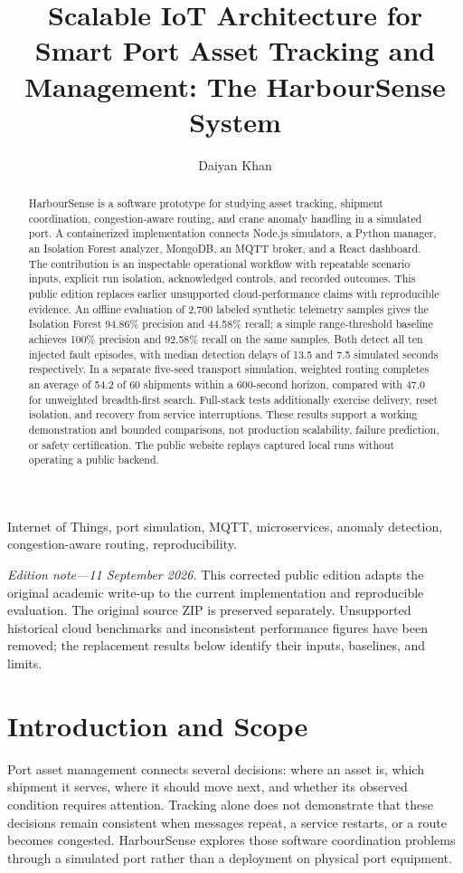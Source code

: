 \documentclass[journal]{IEEEtran}
\title{Scalable IoT Architecture for Smart Port Asset Tracking and Management: The HarbourSense System}
\author{Daiyan Khan}
\begin{document}
\maketitle

\begin{abstract}
HarbourSense is a software prototype for studying asset tracking, shipment coordination, congestion-aware routing, and crane anomaly handling in a simulated port. A containerized implementation connects Node.js simulators, a Python manager, an Isolation Forest analyzer, MongoDB, an MQTT broker, and a React dashboard. The contribution is an inspectable operational workflow with repeatable scenario inputs, explicit run isolation, acknowledged controls, and recorded outcomes. This public edition replaces earlier unsupported cloud-performance claims with reproducible evidence. An offline evaluation of 2,700 labeled synthetic telemetry samples gives the Isolation Forest 94.86\% precision and 44.58\% recall; a simple range-threshold baseline achieves 100\% precision and 92.58\% recall on the same samples. Both detect all ten injected fault episodes, with median detection delays of 13.5 and 7.5 simulated seconds respectively. In a separate five-seed transport simulation, weighted routing completes an average of 54.2 of 60 shipments within a 600-second horizon, compared with 47.0 for unweighted breadth-first search. Full-stack tests additionally exercise delivery, reset isolation, and recovery from service interruptions. These results support a working demonstration and bounded comparisons, not production scalability, failure prediction, or safety certification. The public website replays captured local runs without operating a public backend.
\end{abstract}

\begin{IEEEkeywords}
Internet of Things, port simulation, MQTT, microservices, anomaly detection, congestion-aware routing, reproducibility.
\end{IEEEkeywords}

\noindent\textit{Edition note---11 September 2026.}
This corrected public edition adapts the original academic write-up to the current implementation and reproducible evaluation. The original source ZIP is preserved separately. Unsupported historical cloud benchmarks and inconsistent performance figures have been removed; the replacement results below identify their inputs, baselines, and limits.

\section{Introduction and Scope}
Port asset management connects several decisions: where an asset is, which shipment it serves, where it should move next, and whether its observed condition requires attention. Tracking alone does not demonstrate that these decisions remain consistent when messages repeat, a service restarts, or a route becomes congested. HarbourSense explores those software coordination problems through a simulated port rather than a deployment on physical port equipment.
\end{document}
